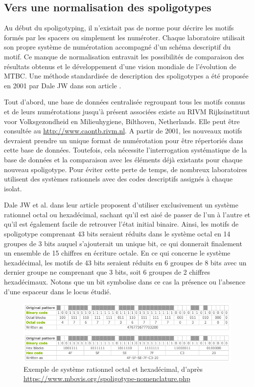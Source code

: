 \documentclass[twoside,a4paper,11pt,frenchb,openany]{report}
\begin{document}

\subsection{Vers une normalisation des spoligotypes}

Au début du spoligotyping, il n'existait pas de norme pour décrire les motifs formés par les spacers ou simplement les numéroter. Chaque laboratoire utilisait son propre système de numérotation accompagné d'un schéma descriptif du motif. Ce manque de normalisation entravait les possibilités de comparaison des résultats obtenus et le développement d'une vision mondiale de l'évolution de MTBC. Une méthode standardisée de description des spoligotypes a été proposée en 2001 par Dale JW dans son article \cite{dale}. 

Tout d'abord, une base de données centralisée regroupant tous les motifs connus et de leurs numérotations jusqu'à présent associées existe au RIVM Rijksinstituut voor Volksgezondheid en Milieuhygiene, Bilthoven, Netherlands. Elle peut être consultée au \url{http://www.caontb.rivm.nl}. A partir de 2001, les nouveaux motifs devraient prendre un unique format de numérotation pour être répertoriés dans cette base de données. Toutefois, cela nécessite l'interrogation systématique de la base de données et la comparaison avec les éléments déjà existants pour chaque nouveau spoligotype. Pour éviter cette perte de temps, de nombreux laboratoires utilisent des systèmes rationnels avec des codes descriptifs assignés à chaque isolat. 

Dale JW et al. dans leur article \cite{dale} proposent d'utiliser exclusivement un système rationnel octal ou hexadécimal, sachant qu'il est aisé de passer de l'un à l'autre et qu'il est également facile de retrouver l'état initial binaire. Ainsi, les motifs de spoligotype comprenant 43 bits seraient réduits dans le système octal en 14 groupes de 3 bits auquel s'ajouterait un unique bit, ce qui donnerait finalement un ensemble de 15 chiffres en écriture octale. En ce qui concerne le système hexadécimal, les motifs de 43 bits seraient réduits en 6 groupes de 8 bits avec un dernier groupe ne comprenant que 3 bits, soit 6 groupes de 2 chiffres hexadécimaux. Notons que un bit symbolise dans ce cas la présence ou l'absence d'une espaceur dans le locus étudié.

\begin{figure}[h!]
\includegraphics[scale=0.6]{hexa.png}
\caption{Exemple de système rationnel octal et hexadécimal, d'après\\ \url{https://www.mbovis.org/spoligotype-nomenclature.php}}
\end{figure}
\end{document}
